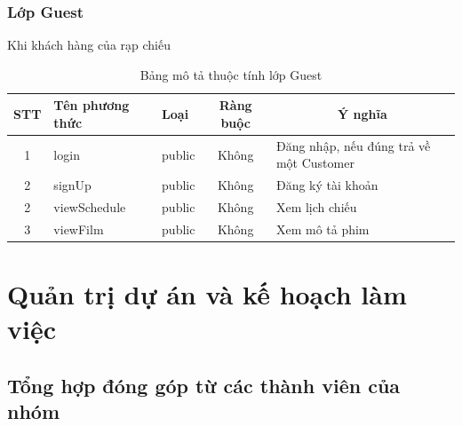 \documentclass[a4paper, 12pt]{article}
\begin{document}
\subsubsection{Lớp Guest}
Khi khách hàng của rạp chiếu 
\begin{table}[H]
	\begin{center}
		\begin{tabular}{|c|l|l|c|l|}
		\hline
		STT & Tên phương thức & Loại   & Ràng buộc & \multicolumn{1}{c|}{Ý nghĩa}                                 \\ \hline
		1   & login           & public &   Không        & Đăng nhập, nếu đúng trả về một Customer \\ \hline
		2   & signUp           & public &   Không        & Đăng ký tài khoản \\ \hline
		2   & viewSchedule    & public &   Không        & Xem lịch chiếu                          \\ \hline
		3   & viewFilm        & public &   Không        & Xem mô tả phim                                \\ \hline
		\end{tabular}
		\caption{Bảng mô tả thuộc tính lớp Guest}
	\end{center}
\end{table}

\clearpage

\section{Quản trị dự án và kế hoạch làm việc}

\subsection{Tổng hợp đóng góp từ các thành viên của nhóm}
\end{document}
